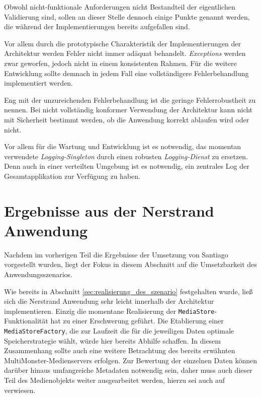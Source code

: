   Obwohl nicht-funktionale Anforderungen nicht Bestandteil der eigentlichen Validierung sind, sollen an dieser Stelle dennoch einige Punkte genannt werden, die während der Implementierungen bereits aufgefallen sind.
  
  Vor allem durch die prototypische Charakteristik der Implementierungen der Architektur werden Fehler nicht immer adäquat behandelt. \emph{Exceptions} werden zwar geworfen, jedoch nicht in einem konsistenten Rahmen. Für die weitere Entwicklung sollte demnach in jedem Fall eine vollständigere Fehlerbehandlung implementiert werden.

  Eng mit der unzureichenden Fehlerbehandlung ist die geringe Fehlerrobustheit zu nennen. Bei nicht vollständig konformer Verwendung der Architektur kann nicht mit Sicherheit bestimmt werden, ob die Anwendung korrekt ablaufen wird oder nicht.

  Vor allem für die Wartung und Entwicklung ist es notwendig, das momentan verwendete \emph{Logging-Singleton} durch einen robusten \emph{Logging-Dienst} zu ersetzen. Denn auch in einer verteilten Umgebung ist es notwendig, ein zentrales Log der Gesamtapplikation zur Verfügung zu haben.



\section{Ergebnisse aus der Nerstrand Anwendung} %
\label{sec:ergebnisse_aus_der_nerstrand_anwendung}

  Nachdem im vorherigen Teil die Ergebnisse der Umsetzung von Santiago vorgestellt wurden, liegt der Fokus in diesem Abschnitt auf die Umsetzbarkeit des Anwendungsszenarios.
  
  Wie bereits in Abschnitt \ref{sec:realisierung_des_szenario} festgehalten wurde, ließ sich die Nerstrand Anwendung sehr leicht innerhalb der Architektur implementieren. Einzig die momentane Realisierung der \verb!MediaStore!-Funktionalität hat zu einer Erschwerung geführt. Die Etablierung einer \verb!MediaStoreFactory!, die zur Laufzeit die für die jeweiligen Daten optimale Speicherstrategie wählt, würde hier bereits Abhilfe schaffen. In diesem Zusammenhang sollte auch eine weitere Betrachtung des bereits erwähnten MultiMonster-Medienservers erfolgen. Zur Bewertung der einzelnen Daten können darüber hinaus umfangreiche Metadaten notwendig sein, daher muss auch dieser Teil des Medienobjekts weiter ausgearbeitet werden, hierzu sei auch auf \citep{lehmann09} verwiesen.
  
